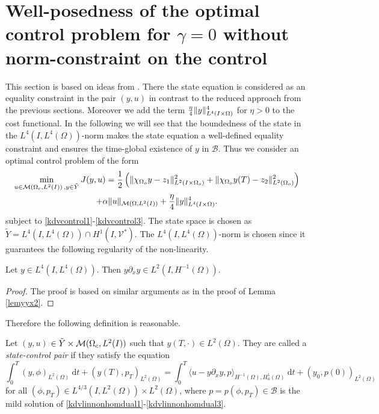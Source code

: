 \section{Well-posedness of the optimal control problem for $\gamma=0$ without norm-constraint on the control}
\label{wp2}
This section is based on ideas from \cite{lions1985control}. There the state equation is considered as an equality constraint in the pair $(y,u)$ in contrast to the reduced approach from the previous sections. Moreover we add the term $\frac{\eta}{4} \lVert y\rVert_{L^4(I\times \Omega)}^4$ for $\eta >0$ to the cost functional. In the following we will see that the boundedness of the state in the $L^4(I,L^4(\Omega))$-norm makes the state equation a well-defined equality constraint and ensures the time-global existence of $y$ in $\mathcal B$. Thus we consider an optimal control problem of the form
\begin{multline}
\min_{u \in \M\,,y\in \tilde Y}J(y,u)=\frac{1}{2}\left(\norm{\chi_{\Omega_{o}}y - z_1}_{L^2(I\times \Omega_{o})}^2+\|\chi_{\Omega_{o}}y(T)-z_2\|_{L^2(\Omega_{o})}^2\right) \\+ \alpha \norm{u}_{\mathcal{M}(\Omega, L^{2}(I))} + \frac{\eta}{4} \norm{y}_{L^4(I\times \Omega)}^4.
\label{cost2}
\end{multline}
subject to \eqref{kdvcontrol1}-\eqref{kdvcontrol3}. The state space is chosen as $\tilde Y = L^4(I,L^4(\Omega))\cap H^1(I,\mathcal V^\ast)$.  The $L^4(I,L^4(\Omega))$-norm is chosen since it guarantees the following regularity of the non-linearity.
\begin{lemma}
\label{lemyyxL4}
 Let $y \in L^4(I,L^4(\Omega))$. Then $y \partial_x y \in L^2(I,H^{-1}(\Omega))$.\\
\end{lemma}
\begin{proof}
{\color{red}The proof is based on similar arguments as in the proof of Lemma \ref{lemyyx2}.}
\qquad\end{proof}

Therefore the following definition is reasonable.
\begin{definition}\label{statecontrolpair}
Let $(y,u)$ $\in \tilde Y\times \mathcal{M}(\Omega_c, L^{2}(I))$ such that $y(T,\cdot)\in L^2(\Omega)$. They are called a \textit{state-control pair} if they satisfy the equation
\begin{equation}\label{weakformkdv L4}
\int_0^T(y,\phi)_{L^2(\Omega)}~\mathrm dt+(y(T),p_T)_{L^2(\Omega)}=\int_0^T\langle u-y\partial_xy,p\rangle_{H^{-1}(\Omega),H^1_0(\Omega)}~\mathrm dt+(y_0,p(0))_{L^2(\Omega)}
\end{equation}
for all $(\phi,p_T) \in L^{4/3}(I,L^2(\Omega))\times L^2(\Omega)$, where $p = p(\phi,p_T)\in \mathcal B$ is the mild solution of \eqref{kdvlinnonhomdual1}-\eqref{kdvlinnonhomdual3}.
\end{definition}

